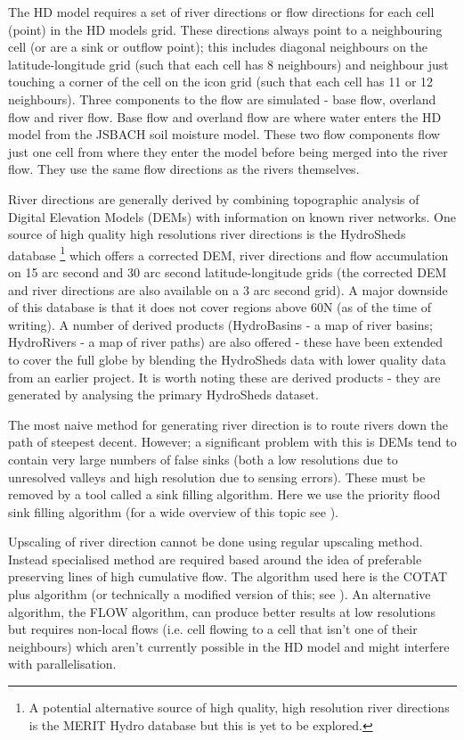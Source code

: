 \documentclass{article}
\begin{document}
The HD model requires a set of river directions or flow directions for each cell (point) in the HD models grid. These directions always point to a neighbouring cell (or are a sink or outflow point); this includes diagonal neighbours on the latitude-longitude grid (such that each cell has 8 neighbours) and neighbour just touching a corner of the cell on the icon grid (such that each cell has 11 or 12 neighbours). Three components to the flow are simulated - base flow, overland flow and river flow. Base flow and overland flow are where water enters the HD model from the JSBACH soil moisture model. These two flow components flow just one cell from where they enter the model before being merged into the river flow. They use the same flow directions as the rivers themselves.

River directions are generally derived by combining topographic analysis of Digital Elevation Models (DEMs) with information on known river networks. One source of high quality high resolutions river directions is the HydroSheds database \cite{doi:10.1029/2008EO100001}\footnote{A potential alternative source of high quality, high resolution river directions is the MERIT Hydro database\cite{doi:10.1029/2019WR024873} but this is yet to be explored.} which offers a corrected DEM, river directions and flow accumulation on 15 arc second and 30 arc second latitude-longitude grids (the corrected DEM and river directions are also available on a 3 arc second grid). A major downside of this database is that it does not cover regions above 60\degree N (as of the time of writing). A number of derived products (HydroBasins - a map of river basins; HydroRivers - a map of river paths) are also offered - these have been extended to cover the full globe by blending the HydroSheds data with lower quality data from an earlier project. It is worth noting these are derived products - they are generated by analysing the primary HydroSheds dataset.

The most naive method for generating river direction is to route rivers down the path of steepest decent. However; a significant problem with this is DEMs tend to contain very large numbers of false sinks (both a low resolutions due to unresolved valleys and high resolution due to sensing errors). These must be removed by a tool called a sink filling algorithm. Here we use the priority flood sink filling algorithm (for a wide overview of this topic see \cite{barnes2014priority}).

Upscaling of river direction cannot be done using regular upscaling method. Instead specialised method are required based around the idea of preferable preserving lines of high cumulative flow. The algorithm used here is the COTAT plus algorithm\cite{WRCR:WRCR10603}  (or technically a modified version of this; see \cite{gmd-11-4291-2018}). An alternative algorithm, the FLOW algorithm\cite{hess-13-2241-2009}, can produce better results at low resolutions but requires non-local flows (i.e. cell flowing to a cell that isn't one of their neighbours) which aren't currently possible in the HD model and might interfere with parallelisation.
\end{document}
